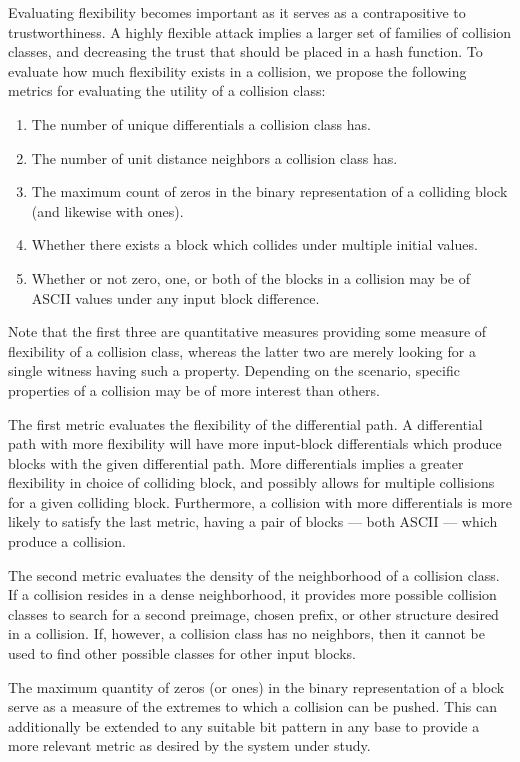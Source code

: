 \documentclass[conference]{IEEEtran}
\begin{document}
Evaluating flexibility becomes important as it serves as a
contrapositive to trustworthiness.  A highly flexible attack implies a
larger set of families of collision classes, and decreasing the trust
that should be placed in a hash function. To evaluate how much flexibility exists in a collision,
we propose the following metrics for evaluating the utility of a collision
class:
\begin{enumerate}
    \item The number of unique differentials a collision class has.
    \item The number of unit distance neighbors a collision class has.
    \item The maximum count of zeros in the binary representation of a
        colliding block (and likewise with ones).
    \item Whether there exists a block which collides under multiple initial
        values.
    \item Whether or not zero, one, or both of the blocks in a collision may
        be of ASCII values under any input block difference.
\end{enumerate}
Note that the first three are quantitative measures providing some measure of
flexibility of a collision class, whereas the latter two are merely looking
for a single witness having such a property. Depending on the scenario,
specific properties of a collision may be of more interest than others.

The first metric evaluates the flexibility of the differential path. A
differential path with more flexibility will have more input-block differentials which
produce blocks with the given differential path. More differentials implies
a greater flexibility in choice of colliding block, and possibly allows
for multiple collisions for a given colliding block. Furthermore, a collision
with more differentials is more likely to satisfy the last metric, having a
pair of blocks --- both ASCII --- which produce a collision.

The second metric evaluates the density of the neighborhood of a collision
class. If a collision resides in a dense neighborhood, it provides more
possible collision classes to search for a second preimage, chosen prefix, or
other structure desired in a collision. If, however, a collision class has no
neighbors, then it cannot be used to find other possible classes for other
input blocks.

The maximum quantity of zeros (or ones) in the binary representation of a
block serve as a measure of the extremes to which a collision can be pushed.
This can additionally be extended to any suitable bit pattern in any base to
provide a more relevant metric as desired by the system under study.
\end{document}
